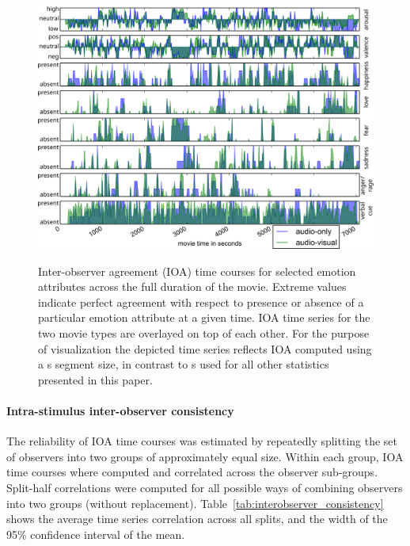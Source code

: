 \begin{figure}
  \centering
  \includegraphics[width=\linewidth]{figures/indicator_ts_allchar}\\
  \caption{Inter-observer agreement (IOA) time courses for selected emotion
    attributes across the full duration of the movie. Extreme values indicate
    perfect agreement with respect to presence or absence of a particular emotion
    attribute at a given time. IOA time series for the two movie types are
    overlayed on top of each other.
    For the purpose of
    visualization the depicted time series reflects IOA computed using a
    \unit[10]{s} segment size, in contrast to \unit[1]{s} used for all other
  statistics presented in this paper.}
  \label{fig:indicatortsallchar}
\end{figure}


\paragraph{Intra-stimulus inter-observer consistency}

The reliability of IOA time courses was estimated by
repeatedly splitting the set of observers into two groups of approximately
equal size. Within each group, IOA time courses where computed and correlated
across the observer sub-groups. Split-half correlations were computed for all
possible ways of combining observers into two groups (without replacement).
Table~\ref{tab:interobserver_consistency} shows the average time series
correlation across all splits, and the width of the 95\% confidence interval
of the mean.

